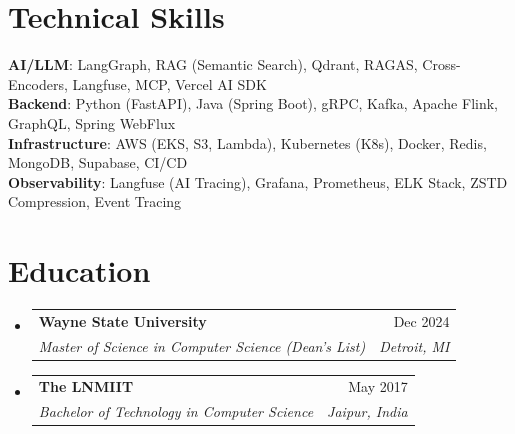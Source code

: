 \documentclass[letterpaper,10pt]{article}
\makeatletter
\newcommand{\resumeSubheading}[4]{
  \vspace{0pt}\item
    \begin{tabular*}{\textwidth}[t]{l@{\extracolsep{\fill}}r}
      \textbf{#1} & #2 \\
      \textit{\small#3} & \textit{\small #4} \\
    \end{tabular*}\vspace{-5pt}
}
\newcommand{\resumeSubHeadingListStart}{\begin{itemize}[leftmargin=0in, label={}]}
\newcommand{\resumeSubHeadingListEnd}{\end{itemize}}
\makeatother
\begin{document}
\section{Technical Skills}
 \begin{itemize}[leftmargin=0in, label={}, itemsep=0pt]
    \small{\item{
     \textbf{AI/LLM}{: LangGraph, RAG (Semantic Search), Qdrant, RAGAS, Cross-Encoders, Langfuse, MCP, Vercel AI SDK} \\[1pt]
     \textbf{Backend}{: Python (FastAPI), Java (Spring Boot), gRPC, Kafka, Apache Flink, GraphQL, Spring WebFlux} \\[1pt]
     \textbf{Infrastructure}{: AWS (EKS, S3, Lambda), Kubernetes (K8s), Docker, Redis, MongoDB, Supabase, CI/CD} \\[1pt]
     \textbf{Observability}{: Langfuse (AI Tracing), Grafana, Prometheus, ELK Stack, ZSTD Compression, Event Tracing}
    }}
 \end{itemize}

\section{Education}
  \resumeSubHeadingListStart
    \resumeSubheading
      {Wayne State University}{Dec 2024}
      {Master of Science in Computer Science (Dean's List)}{Detroit, MI}
    \resumeSubheading
      {The LNMIIT}{May 2017}
      {Bachelor of Technology in Computer Science}{Jaipur, India}
  \resumeSubHeadingListEnd
\end{document}
